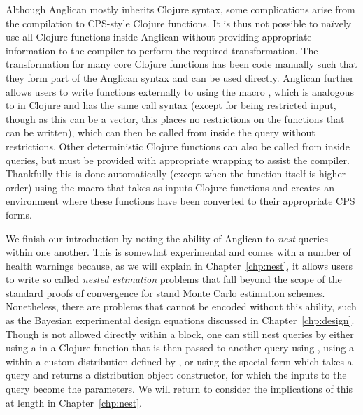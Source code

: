 Although Anglican mostly inherits Clojure syntax, some complications arise from the compilation to
CPS-style Clojure functions.  It is thus not possible to na\"{i}vely use all Clojure functions inside Anglican
without providing appropriate information to the compiler to perform the required transformation.
The transformation for many core Clojure functions has been code manually such that they form
part of the Anglican syntax and can be used directly.  Anglican further allows users to write functions externally
to  using the macro , which is analogous to  in Clojure and has the same call syntax (except
for being restricted input, though as this can be a vector, this places no restrictions on the functions that can be
written), which can then be called from inside the query without restrictions.  Other deterministic Clojure functions can also
be called from inside queries, but must be provided with appropriate wrapping to assist the compiler.  Thankfully
this is done automatically (except when the function itself is higher order) using the macro
{\small {}} that takes as inputs Clojure functions and creates an environment where
these functions have been converted to their appropriate CPS forms.

We finish our introduction by noting the ability of Anglican to \emph{nest} queries within one another.  This
is somewhat experimental and comes with a number of health warnings because, as we will explain in Chapter~\ref{chp:nest},
it allows users to write so called \emph{nested estimation} problems that fall beyond the scope of the standard
proofs of convergence for stand Monte Carlo estimation schemes. Nonetheless, there are problems that cannot
be encoded without this ability, such as the Bayesian experimental design equations discussed in Chapter~\ref{chp:design}.
Though \doquery is not allowed directly within a  block, one can still nest queries by 
either using a \doquery in a Clojure function that is then passed to another query using {\small {}},
using a \doquery within a custom distribution defined by , or using the special form \conditional which
takes a query and returns a distribution object constructor, for which the inputs to the query become the parameters.
We will return to consider the implications of this at length in Chapter~\ref{chp:nest}.